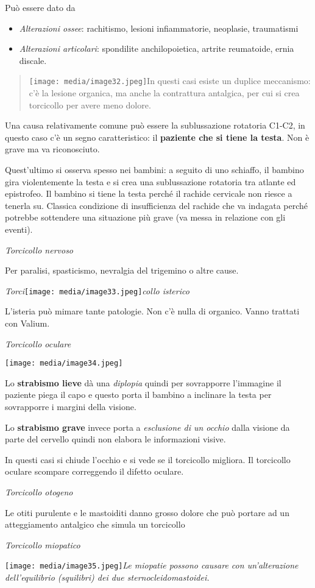 \documentclass[]{article}
\begin{document}
Può essere dato da

\begin{itemize}
\item
  \emph{Alterazioni ossee}: rachitismo, lesioni infiammatorie,
  neoplasie, traumatismi
\item
  \emph{Alterazioni articolari}: spondilite anchilopoietica, artrite
  reumatoide, ernia discale.
\end{itemize}

\begin{quote}
\texttt{[image: media/image32.jpeg]}In
questi casi esiste un duplice meccanismo: c'è la lesione organica, ma
anche la contrattura antalgica, per cui si crea torcicollo per avere
meno dolore.
\end{quote}

Una causa relativamente comune può essere la sublussazione rotatoria
C1-C2, in questo caso c'è un segno caratteristico: il \textbf{paziente
che si tiene la testa}. Non è grave ma va riconosciuto.

Quest'ultimo si osserva spesso nei bambini: a seguito di uno schiaffo,
il bambino gira violentemente la testa e si crea una sublussazione
rotatoria tra atlante ed epistrofeo. Il bambino si tiene la testa perché
il rachide cervicale non riesce a tenerla su. Classica condizione di
insufficienza del rachide che va indagata perché potrebbe sottendere una
situazione più grave (va messa in relazione con gli eventi).

\emph{Torcicollo nervoso}

Per paralisi, spasticismo, nevralgia del trigemino o altre cause.

\emph{Torci}\texttt{[image: media/image33.jpeg]}\emph{collo
isterico}

L'isteria può mimare tante patologie. Non c'è nulla di organico. Vanno
trattati con Valium.

\emph{Torcicollo oculare}

\texttt{[image: media/image34.jpeg]}

Lo \textbf{strabismo lieve} dà una \emph{diplopia} quindi per
sovrapporre l'immagine il paziente piega il capo e questo porta il
bambino a inclinare la testa per sovrapporre i margini della visione.

Lo \textbf{strabismo grave} invece porta a \emph{esclusione di un
occhio} dalla visione da parte del cervello quindi non elabora le
informazioni visive.

In questi casi si chiude l'occhio e si vede se il torcicollo migliora.
Il torcicollo oculare scompare correggendo il difetto oculare.

\emph{Torcicollo otogeno}

Le otiti purulente e le mastoiditi danno grosso dolore che può portare
ad un atteggiamento antalgico che simula un torcicollo

\emph{Torcicollo miopatico}

\texttt{[image: media/image35.jpeg]}\emph{Le
miopatie possono causare con un'alterazione dell'equilibrio (squilibri)
dei due sternocleidomastoidei.}
\end{document}
